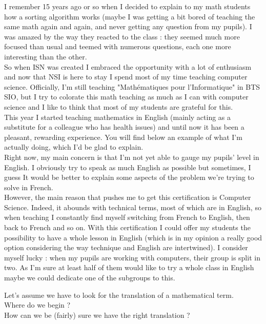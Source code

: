 \documentclass[12pt,a4paper,article,english,firamath]{nsi}
\begin{document}
I remember 15 years ago or so when I decided to explain to my math students how a sorting algorithm works (maybe I was getting a bit bored of teaching the same math again and again, and never getting any question from my pupils). I was amazed by the way they reacted to the class : they seemed much more focused than usual and teemed with numerous questions, each one more interesting than the other.\\
So when ISN was created I embraced the opportunity with a lot of enthusiasm and now that NSI is here to stay  I spend most of my time teaching computer science. Officially, I'm still teaching "Mathématiques pour l'Informatique" in BTS SIO, but I try to colorate this math teaching as much as I can with computer science and I like to think that most of my students are grateful for this.\\

This year I started teaching mathematics in English (mainly acting as a substitute for a colleague who has health issues) and until now it has been a pleasant, rewarding experience. You will find below an example of what I'm actually doing, which I'd be glad to explain.\\
Right now, my main concern is that I'm not yet able to gauge my pupils' level in English. I obviously try to speak as much English as possible but sometimes, I guess It would be better to explain some aspects of the problem we're trying to solve in French.\\

However, the main reason that pushes me to get this certification is Computer Science. Indeed, it abounds with technical terms, most of which are in English, so when teaching I constantly find myself switching from French to English, then back to French and so on. With this certification I could offer my students the possibility to have a whole lesson in English (which is in my opinion a really good option considering the way technique and English are intertwined). I consider myself lucky : when my pupils are working with computers, their group is split in two. As I'm sure at least half of them would like to try a whole class in English maybe we could dedicate one of the  subgroups to this.

\newpage 
{}
\maketitle

Let's assume we have to look for the translation of a mathematical term.\\ Where do we begin ?\\ How can we be (fairly) sure we have the right translation ?
\end{document}
